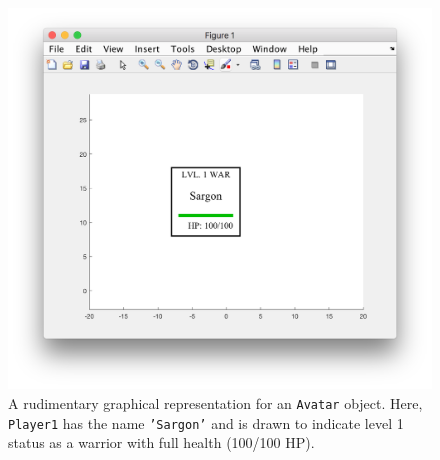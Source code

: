 \begin{figure}[htbp] %
   \centering
   \includegraphics[width=5in]{graphics/AvatarDrawGraphOut.png} 
   \caption{A rudimentary graphical representation for an \texttt{Avatar} object. Here, \texttt{Player1} has the name \texttt{'Sargon'} and is drawn to indicate level 1 status as a warrior with full health (100/100 HP).}
   \label{fig:AvatarDrawing}
\end{figure}
